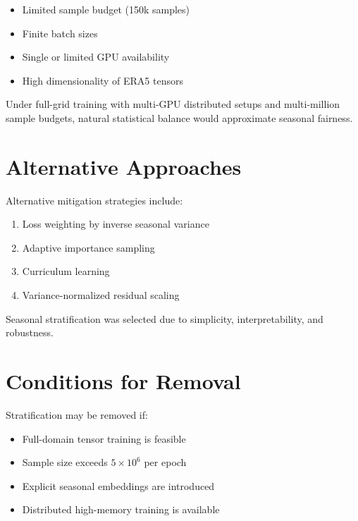 \documentclass[12pt]{article}
\begin{document}
\begin{itemize}
    \item Limited sample budget (150k samples)
    \item Finite batch sizes
    \item Single or limited GPU availability
    \item High dimensionality of ERA5 tensors
\end{itemize}

Under full-grid training with multi-GPU distributed setups and multi-million sample budgets, natural statistical balance would approximate seasonal fairness.

\section{Alternative Approaches}

Alternative mitigation strategies include:

\begin{enumerate}
    \item Loss weighting by inverse seasonal variance
    \item Adaptive importance sampling
    \item Curriculum learning
    \item Variance-normalized residual scaling
\end{enumerate}

Seasonal stratification was selected due to simplicity, interpretability, and robustness.

\section{Conditions for Removal}

Stratification may be removed if:

\begin{itemize}
    \item Full-domain tensor training is feasible
    \item Sample size exceeds $5 \times 10^6$ per epoch
    \item Explicit seasonal embeddings are introduced
    \item Distributed high-memory training is available
\end{itemize}

\end{document}
